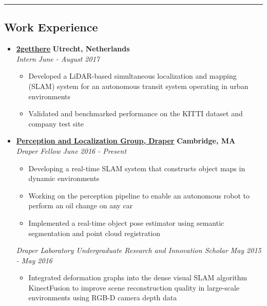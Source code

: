 \documentclass[10pt,letterpaper]{article}
\begin{document}
\hrule
\vspace{-0.6em}

\subsection*{Work Experience}
  \begin{itemize}
    \parskip=-0.1em

    \item[]
    {\href{http://www.2getthere.eu/}{\textbf{2getthere}} \hfill
      \textbf{Utrecht, Netherlands}}
    \\
        {\emph{Intern} \hfill \emph{June - August 2017}}
	
	\begin{itemize}[label=\textbullet]
	\itemsep0em 
	\item Developed a LiDAR-based simultaneous localization and mapping (SLAM) system for an autonomous transit system operating in urban environments
	\item Validated and benchmarked performance on the KITTI dataset and company test site
\end{itemize}

    \item[]
    {\href{http://draper.com/}{\textbf{Perception and Localization Group, Draper}} \hfill
      \textbf{Cambridge, MA}}
    \\
        {\emph{Draper Fellow} \hfill \emph{June 2016 - Present}}
	
	\begin{itemize}[label=\textbullet]
	\itemsep0em 
	\item Developing a real-time SLAM system that constructs object maps in dynamic environments
	\item Working on the perception pipeline to enable an autonomous robot to perform an oil change on any car
	\item Implemented a real-time object pose estimator using semantic segmentation and point cloud registration 
		\end{itemize} 
    {\emph{Draper Laboratory Undergraduate Research and Innovation Scholar} \hfill \emph{May 2015 - May 2016}}
	
	\begin{itemize}[label=\textbullet]
	\itemsep0em 
	\item Integrated deformation graphs into the dense visual SLAM  algorithm KinectFusion to improve scene reconstruction quality in large-scale environments using RGB-D camera depth data
	

\end{itemize}
\end{itemize}
\end{document}
